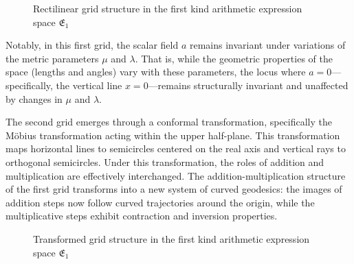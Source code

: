 \begin{figure}[ht]
\centering
{}
\caption{Rectilinear grid structure in the first kind arithmetic expression space $\mathfrak{E}_1$}\label{fig:grid1}
\end{figure}

Notably, in this first grid, the scalar field $a$ remains invariant under variations of the metric parameters $\mu$ and $\lambda$. That is, while the geometric properties of the space (lengths and angles) vary with these parameters, the locus where $a=0$—specifically, the vertical line $x=0$—remains structurally invariant and unaffected by changes in $\mu$ and $\lambda$.

The second grid emerges through a conformal transformation, specifically the Möbius transformation acting within the upper half-plane. This transformation maps horizontal lines to semicircles centered on the real axis and vertical rays to orthogonal semicircles. Under this transformation, the roles of addition and multiplication are effectively interchanged. The addition-multiplication structure of the first grid transforms into a new system of curved geodesics: the images of addition steps now follow curved trajectories around the origin, while the multiplicative steps exhibit contraction and inversion properties.

\begin{figure}[ht]
\centering
{}
\caption{Transformed grid structure in the first kind arithmetic expression space $\mathfrak{E}_1$}\label{fig:grid2}
\end{figure}

